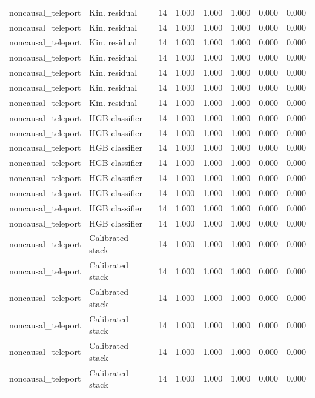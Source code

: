 {\begin{longtable}{llrrrrrr}
noncausal\_teleport & Kin. residual & 14 & 1.000 & 1.000 & 1.000 & 0.000 & 0.000 \\
noncausal\_teleport & Kin. residual & 14 & 1.000 & 1.000 & 1.000 & 0.000 & 0.000 \\
noncausal\_teleport & Kin. residual & 14 & 1.000 & 1.000 & 1.000 & 0.000 & 0.000 \\
noncausal\_teleport & Kin. residual & 14 & 1.000 & 1.000 & 1.000 & 0.000 & 0.000 \\
noncausal\_teleport & Kin. residual & 14 & 1.000 & 1.000 & 1.000 & 0.000 & 0.000 \\
noncausal\_teleport & Kin. residual & 14 & 1.000 & 1.000 & 1.000 & 0.000 & 0.000 \\
noncausal\_teleport & Kin. residual & 14 & 1.000 & 1.000 & 1.000 & 0.000 & 0.000 \\
noncausal\_teleport & HGB classifier & 14 & 1.000 & 1.000 & 1.000 & 0.000 & 0.000 \\
noncausal\_teleport & HGB classifier & 14 & 1.000 & 1.000 & 1.000 & 0.000 & 0.000 \\
noncausal\_teleport & HGB classifier & 14 & 1.000 & 1.000 & 1.000 & 0.000 & 0.000 \\
noncausal\_teleport & HGB classifier & 14 & 1.000 & 1.000 & 1.000 & 0.000 & 0.000 \\
noncausal\_teleport & HGB classifier & 14 & 1.000 & 1.000 & 1.000 & 0.000 & 0.000 \\
noncausal\_teleport & HGB classifier & 14 & 1.000 & 1.000 & 1.000 & 0.000 & 0.000 \\
noncausal\_teleport & HGB classifier & 14 & 1.000 & 1.000 & 1.000 & 0.000 & 0.000 \\
noncausal\_teleport & HGB classifier & 14 & 1.000 & 1.000 & 1.000 & 0.000 & 0.000 \\
noncausal\_teleport & Calibrated stack & 14 & 1.000 & 1.000 & 1.000 & 0.000 & 0.000 \\
noncausal\_teleport & Calibrated stack & 14 & 1.000 & 1.000 & 1.000 & 0.000 & 0.000 \\
noncausal\_teleport & Calibrated stack & 14 & 1.000 & 1.000 & 1.000 & 0.000 & 0.000 \\
noncausal\_teleport & Calibrated stack & 14 & 1.000 & 1.000 & 1.000 & 0.000 & 0.000 \\
noncausal\_teleport & Calibrated stack & 14 & 1.000 & 1.000 & 1.000 & 0.000 & 0.000 \\
noncausal\_teleport & Calibrated stack & 14 & 1.000 & 1.000 & 1.000 & 0.000 & 0.000 \\

\end{longtable}}
